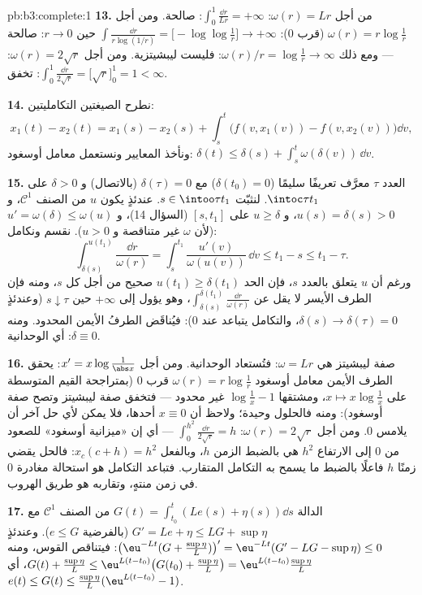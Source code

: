 \begin{solution}{pb:b3:complete:1}
\textbf{13.} من أجل $\omega(r) = Lr$: $\int_0^1\frac{\dd r}{Lr} =
+\infty$: صالحة. ومن أجل
$\omega(r) = r\log\frac1r$ (قرب $0$): $\int\frac{\dd r}{r\log(1/r)} = \bigl[-\log\log\frac1r\bigr]
\to +\infty$ حين $r \to 0$: صالحة --- ومع ذلك
$\omega(r)/r =
\log\frac1r \to \infty$: فليست ليبشيتزية. ومن أجل $\omega(r) = 2\sqrt
r$: $\int_0^1\frac{\dd r}{2\sqrt r} = \bigl[\sqrt r\bigr]_0^1
= 1 < \infty$: تخفق.

\textbf{14.} نطرح الصيغتين التكامليتين:
\[
x_1(t) - x_2(t) = x_1(s) - x_2(s) + \int_s^t\bigl(f(v,
x_1(v)) - f(v, x_2(v))\bigr)\dd v,
\]
ونأخذ المعايير ونستعمل معامل أوسغود: $\delta(t) \leq
\delta(s) + \int_s^t\omega(\delta(v))\,\dd v$.

\textbf{15.} العدد $\tau$ معرَّف تعريفًا سليمًا ($\delta(t_0) = 0$) مع
$\delta(\tau) = 0$ (بالاتصال) و $\delta > 0$ على $\intoc\tau{t_1}$. لنثبّت $s \in \intoo\tau{t_1}$.
عندئذٍ يكون $u$ من الصنف $\mathcal C^1$، و $u(s) = \delta(s) > 0$، و
$u \geq \delta$ على $[s, t_1]$ (السؤال 14)، و $u' = \omega(\delta) \leq
\omega(u)$ (لأن
$\omega$ غير متناقصة و $u > 0$). نقسم ونكامل:
\[
\int_{\delta(s)}^{u(t_1)}\frac{\dd r}{\omega(r)}
= \int_s^{t_1}\frac{u'(v)}{\omega(u(v))}\,\dd v \leq t_1 - s
\leq t_1 - \tau .
\]
ورغم أن $u$ يتعلق بالعدد $s$، فإن الحد $u(t_1) \geq
\delta(t_1)$ صحيح من أجل كل $s$،
ومنه فإن الطرف الأيسر لا يقل عن $\int_{\delta(s)}^{\delta(t_1)}\frac{\dd r}{\omega(r)}$، وهو يؤول إلى
$+\infty$ حين $s \downarrow \tau$ (وعندئذٍ $\delta(s) \to \delta(\tau) = 0$، والتكامل يتباعد عند
$0$): فيُناقَض الطرفُ الأيمن المحدود. ومنه $\delta \equiv 0$: أي
الوحدانية.

\textbf{16.} صفة ليبشيتز هي $\omega = Lr$: فتُستعاد الوحدانية.
ومن أجل $x' = x\log\frac1{\abs x}$: يحقق الطرف الأيمن معامل أوسغود $\omega(r) = r\log\frac1r$ قرب $0$
(بمتراجحة القيم المتوسطة على $x \mapsto x\log\frac1x$، ومشتقها $\log\frac1x - 1$ غير محدود
--- فتخفق صفة ليبشيتز وتصح صفة أوسغود): ومنه فالحلول وحيدة؛
ولاحظ أن $x \equiv 0$ أحدها، فلا يمكن لأي حل آخر أن يلامس $0$.
ومن أجل $\omega(r) = 2\sqrt r$: $\int_0^{h^2}\frac{\dd r}{2\sqrt r} = h$ --- أي إن «ميزانية أوسغود» للصعود من
$0$ إلى الارتفاع $h^2$ هي بالضبط الزمن $h$، وبالفعل $x_c(c + h) = h^2$:
فالحل يقضي زمنًا $h$ فاعلًا بالضبط ما يسمح به التكامل المتقارب.
فتباعد التكامل هو استحالة مغادرة $0$ في زمن منتهٍ، وتقاربه هو
طريق الهروب.

\textbf{17.} الدالة $G(t) = \int_{t_0}^t(Le(s) + \eta(s))\dd s$ من الصنف $\mathcal C^1$ مع $G' = Le + \eta \leq LG + \sup\eta$
(بالفرضية $e \leq G$). وعندئذٍ $\bigl(\eu^{-Lt}(G +
\tfrac{\sup\eta}L)\bigr)' = \eu^{-Lt}(G' - LG - \sup\eta)
\leq 0$: فيتناقص القوس، ومنه
$G(t) + \frac{\sup\eta}L
\leq \eu^{L(t - t_0)}\bigl(G(t_0) + \frac{\sup\eta}L\bigr) =
\eu^{L(t-t_0)}\frac{\sup\eta}L$، أي $e(t) \leq G(t) \leq
\frac{\sup\eta}L(\eu^{L(t-t_0)} - 1)$.


\end{solution}
